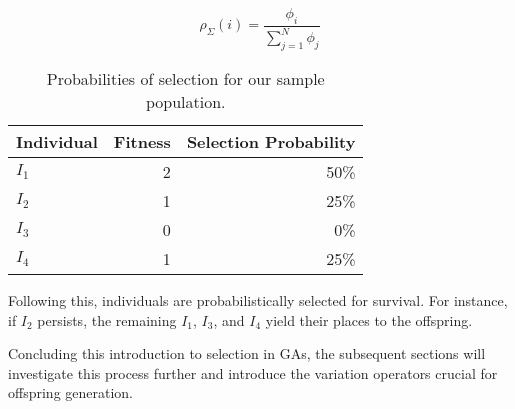   \begin{equation}
    \label{eq:selection_probability}
    \rho_\Sigma(i) = \frac{\phi_i}{\sum_{j=1}^{N}\phi_j}
  \end{equation}

  \begin{table}[ht!]
    \centering
    \begin{tabular}{|l|r|r|}
      \hline
      Individual & Fitness & Selection Probability \\
      \hline
      \(I_1\)    & 2       & 50\% \\
      \(I_2\)    & 1       & 25\% \\
      \(I_3\)    & 0       & 0\%  \\
      \(I_4\)    & 1       & 25\% \\
      \hline
    \end{tabular}
    \caption{Probabilities of selection for our sample population.}
    \label{tab:selection_probabilities}
  \end{table}

  Following this, individuals are probabilistically selected for survival.
  For instance, if \(I_2\) persists, the remaining \(I_1\), \(I_3\), and \(I_4\) 
  yield their places to the offspring.

  Concluding this introduction to selection in GAs, the subsequent sections will 
  investigate this process further and introduce the variation operators crucial 
  for offspring generation.
  